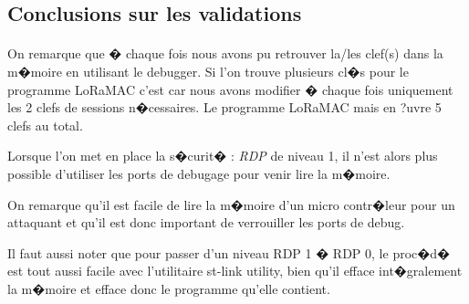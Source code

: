 \documentclass[a4paper, titlepage,12pt]{report}
\begin{document}
\subsection{Conclusions sur les validations}
\paragraph{}
On remarque que � chaque fois nous avons pu retrouver la/les clef(s) dans la m�moire en utilisant le debugger.
Si l'on trouve plusieurs cl�s pour le programme LoRaMAC c'est car nous avons modifier � chaque fois uniquement les 2 clefs de sessions n�cessaires. Le programme LoRaMAC mais en ?uvre 5 clefs au total.

Lorsque l'on met en place la s�curit� : \textit{RDP} de niveau 1, il n'est alors plus possible d'utiliser les ports de debugage pour venir lire la m�moire.

On remarque qu'il est facile de lire la m�moire d'un micro contr�leur pour un attaquant et qu'il est donc important de verrouiller les ports de debug.

Il faut aussi noter que pour passer d'un niveau RDP 1 � RDP 0, le proc�d� est tout aussi facile avec l'utilitaire st-link utility, bien qu'il efface int�gralement la m�moire et efface donc le programme qu'elle contient.

\pagebreak
\pagebreak
 

\end{document}

